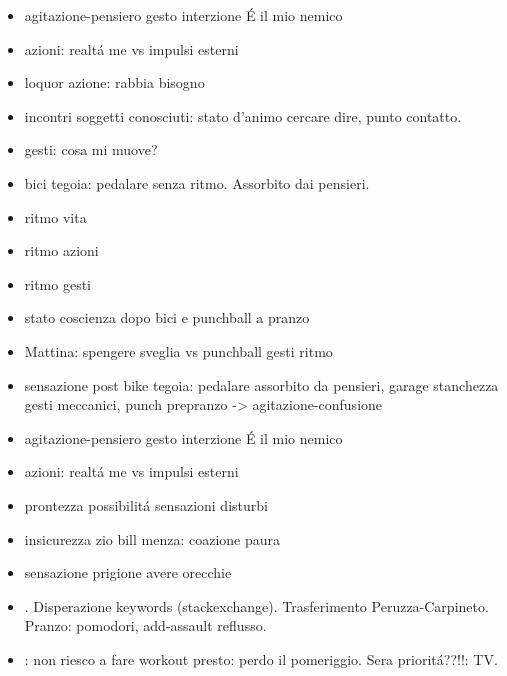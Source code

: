 \begin{itemize}
\item agitazione-pensiero gesto interzione \'E il mio nemico

\item azioni: realt\'a me vs impulsi esterni
\item loquor azione: rabbia bisogno

\item incontri soggetti conosciuti: stato d'animo cercare dire, punto contatto.

\item gesti: cosa mi muove?

\item bici tegoia: pedalare senza ritmo. Assorbito dai pensieri.

\item ritmo vita

\item ritmo azioni

\item ritmo gesti

\item stato coscienza dopo bici e punchball a pranzo

\item Mattina: spengere sveglia vs punchball gesti ritmo

\item sensazione post bike tegoia: pedalare assorbito da pensieri, garage stanchezza gesti meccanici, punch prepranzo -> agitazione-confusione

\item agitazione-pensiero gesto interzione \'E il mio nemico

\item azioni: realt\'a me vs impulsi esterni

\item prontezza possibilit\'a sensazioni disturbi

\item insicurezza zio bill menza: coazione paura

\item sensazione prigione avere orecchie

\item {}. Disperazione keywords (stackexchange). Trasferimento Peruzza-Carpineto. Pranzo: pomodori, add-assault reflusso. 

\item {}: non riesco a fare workout presto: perdo il pomeriggio. Sera priorit\'a??!!: TV.


\end{itemize}
